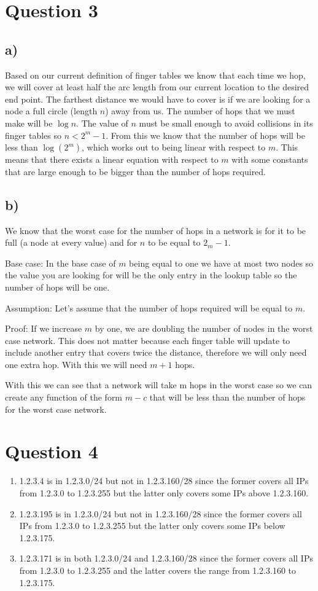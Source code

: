 \documentclass[12pt]{article}
\begin{document}
\section*{Question 3}
\subsection*{a)}
Based on our current definition of finger tables we know that each time we hop, we will cover at least half the arc length from our current location to the desired end point. The farthest distance we would have to cover is if we are looking for a node a full circle (length $n$) away from us. The number of hops that we must make will be $\log n$. The value of $n$ must be small enough to avoid collisions in its finger tables so $n < 2^m - 1$. From this we know that the number of hops will be less than $\log(2^m)$, which works out to being linear with respect to $m$. This means that there exists a linear equation with respect to $m$ with some constants that are large enough to be bigger than the number of hops required.

\subsection*{b)}
We know that the worst case for the number of hops in a network is for it to be full (a node at every value) and for $n$ to be equal to $2_m - 1$.

Base case: In the base case of $m$ being equal to one we have at most two nodes so the value you are looking for will be the only entry in the lookup table so the number of hops will be one.

Assumption: Let's assume that the number of hops required will be equal to $m$.

Proof: If we increase $m$ by one, we are doubling the number of nodes in the worst case network. This does not matter because each finger table will update to include another entry that covers twice the distance, therefore we will only need one extra hop. With this we will need $m+1$ hops.

With this we can see that a network will take m hops in the worst case so we can create any function of the form $m - c$ that will be less than the number of hops for the worst case network.

\section*{Question 4}
\begin{enumerate}
\item 1.2.3.4 is in 1.2.3.0/24 but not in 1.2.3.160/28 since the former covers all IPs from 1.2.3.0 to 1.2.3.255 but the latter only covers some IPs above 1.2.3.160.
\item 1.2.3.195 is in 1.2.3.0/24 but not in 1.2.3.160/28 since the former covers all IPs from 1.2.3.0 to 1.2.3.255 but the latter only covers some IPs below 1.2.3.175.
\item 1.2.3.171 is in both 1.2.3.0/24 and 1.2.3.160/28 since the former covers all IPs from 1.2.3.0 to 1.2.3.255 and the latter covers the range from 1.2.3.160 to 1.2.3.175.
\end{enumerate}
\end{document}
